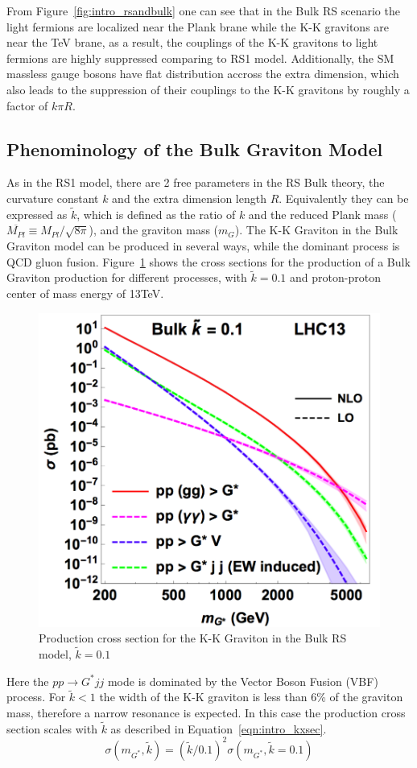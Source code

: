 From Figure~\ref{fig:intro_rsandbulk} one can see that in the Bulk RS scenario the light fermions are localized near the Plank brane while the K-K gravitons are near the TeV brane, as a result, the couplings of the K-K gravitons to light fermions are highly suppressed comparing to RS1 model. Additionally, the SM massless gauge bosons have flat distribution accross the extra dimension, which also leads to the suppression of their couplings to the K-K gravitons by roughly a factor of $k\pi R$.

\subsection{Phenominology of the Bulk Graviton Model}
As in the RS1 model, there are 2 free parameters in the RS Bulk theory, the curvature constant $k$ and the extra dimension length $R$. Equivalently they can be expressed as $\tilde{k}$, which is defined as the ratio of $k$ and the reduced Plank mass ($\overline{M_{Pl}}\equiv M_{Pl}/\sqrt{8\pi}$), and the graviton mass ($m_{G}$). The K-K Graviton in the Bulk Graviton model can be produced in several ways, while the dominant process is QCD gluon fusion. Figure~\ref{fig:intro_Gxsec} shows the cross sections for the production of a Bulk Graviton production for different processes, with $\tilde{k}=0.1$ and proton-proton center of mass energy of 13TeV.
\begin{figure}[htbp]
\begin{center}
\includegraphics[width=0.5\linewidth]{figures/intro_Gxsec.png}
\caption{Production cross section for the K-K Graviton in the Bulk RS model, $\tilde{k}=0.1$}
\label{fig:intro_Gxsec}
\end{center}
\end{figure}
Here the $pp\rightarrow G^{*}jj$ mode is dominated by the Vector Boson Fusion (VBF) process. For $\tilde{k}<1$ the width of the K-K graviton is less than 6\% of the graviton mass, therefore a narrow resonance is expected. In this case the production cross section scales with $\tilde{k}$ as described in Equation~\ref{eqn:intro_kxsec}.
\begin{equation}
\sigma (m_{G^{*}},\tilde{k}) = (\tilde{k}/0.1)^2 \sigma (m_{G^{*}},\tilde{k}=0.1)
\label{eqn:intro_kxsec}
\end{equation}

